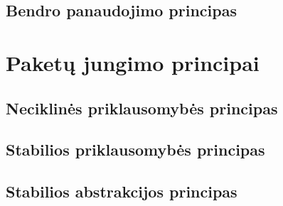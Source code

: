 
\subsection{Bendro panaudojimo principas}

\label{subsection:package:crp}


\section{Paketų jungimo principai}

\subsection{Neciklinės priklausomybės principas}

\label{subsection:package:adp}


\subsection{Stabilios priklausomybės principas}

\label{subsection:package:sdp}


\subsection{Stabilios abstrakcijos principas}

\label{subsection:package:sap}

